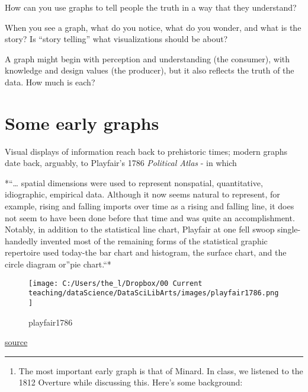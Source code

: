 \documentclass[]{book}
\providecommand{\tightlist}{%
  \setlength{\itemsep}{0pt}\setlength{\parskip}{0pt}}
\theoremstyle{definition}
\theoremstyle{definition}
\theoremstyle{definition}
\theoremstyle{remark}
\begin{document}
How can you use graphs to tell people the truth in a way that they
understand?

When you see a graph, what do you notice, what do you wonder, and what
is the story? Is ``story telling'' what visualizations should be about?

A graph might begin with perception and understanding (the consumer),
with knowledge and design values (the producer), but it also reflects
the truth of the data. How much is each?

\section{Some early graphs}\label{some-early-graphs}

Visual displays of information reach back to prehistoric times; modern
graphs date back, arguably, to Playfair's 1786 \emph{Political Atlas} -
in which

*``\ldots{} spatial dimensions were used to represent nonspatial,
quantitative, idiographic, empirical data. Although it now seems natural
to represent, for example, rising and falling imports over time as a
rising and falling line, it does not seem to have been done before that
time and was quite an accomplishment. Notably, in addition to the
statistical line chart, Playfair at one fell swoop single-handedly
invented most of the remaining forms of the statistical graphic
repertoire used today-the bar chart and histogram, the surface chart,
and the circle diagram or''pie chart.``*

\begin{figure}
\centering
\texttt{[image: C:/Users/the\_l/Dropbox/00 Current teaching/dataScience/DataSciLibArts/images/playfair1786.png]}
\caption{playfair1786}
\end{figure}

\href{https://robots.thoughtbot.com/analyzing-minards-visualization-of-napoleons-1812-march}{source}

\begin{center}\rule{0.5\linewidth}{\linethickness}\end{center}

\begin{enumerate}
\def\labelenumi{\arabic{enumi})}
\setcounter{enumi}{1}
\tightlist
\item
  The most important early graph is that of Minard. In class, we
  listened to the 1812 Overture while discussing this. Here's some
  background:
\end{enumerate}
\end{document}
